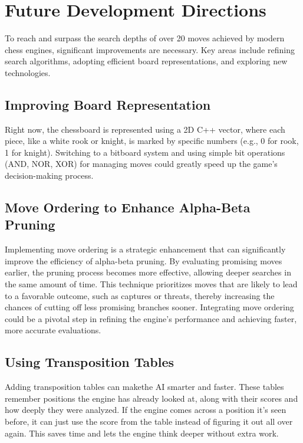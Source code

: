 \documentclass{article}
\begin{document}
\section{Future Development Directions}

To reach and surpass the search depths of over 20 moves achieved by modern chess engines, significant improvements are necessary. Key areas include refining search algorithms, adopting efficient board representations, and exploring new technologies.

\subsection{Improving Board Representation}

Right now, the chessboard is represented using a 2D C++ vector, where each piece, like a white rook or knight, is marked by specific numbers (e.g., 0 for rook, 1 for knight). Switching to a bitboard system and using simple bit operations (AND, NOR, XOR) for managing moves could greatly speed up the game's decision-making process.

\subsection{Move Ordering to Enhance Alpha-Beta Pruning}

Implementing move ordering is a strategic enhancement that can significantly improve the efficiency of alpha-beta pruning. By evaluating promising moves earlier, the pruning process becomes more effective, allowing deeper searches in the same amount of time. This technique prioritizes moves that are likely to lead to a favorable outcome, such as captures or threats, thereby increasing the chances of cutting off less promising branches sooner. Integrating move ordering could be a pivotal step in refining the engine's performance and achieving faster, more accurate evaluations.

\subsection{Using Transposition Tables}
Adding transposition tables can makethe AI smarter and faster. These tables remember positions the engine has already looked at, along with their scores and how deeply they were analyzed. If the engine comes across a position it's seen before, it can just use the score from the table instead of figuring it out all over again. This saves time and lets the engine think deeper without extra work.
\end{document}
